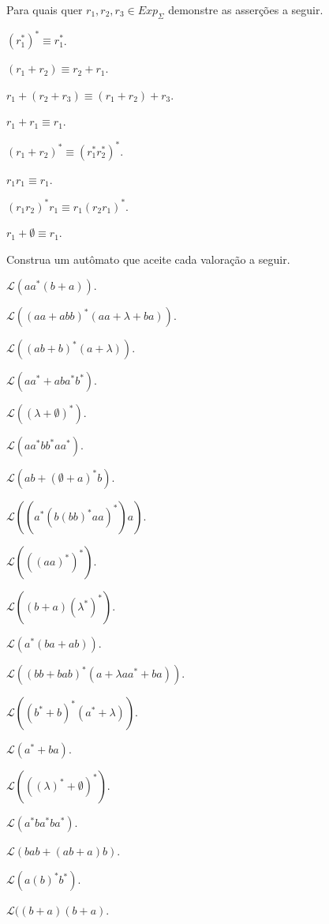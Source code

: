 \begin{problem}\label{prob:Regulares34}
	Para quais quer $r_1, r_2, r_3 \in Exp_\Sigma$ demonstre as asserções a seguir.
\end{problem}

\begin{exerList}
	\item $(r_1^*)^* \equiv r_1^*$.
	\item $(r_1 + r_2) \equiv r_2 + r_1$.
	\item $r_1 + (r_2 + r_3) \equiv (r_1 + r_2) + r_3$.
	\item $r_1 + r_1 \equiv r_1$.
	\item $(r_1 + r_2)^* \equiv (r_1^* r_2^*)^*$.
	\item $r_1r_1 \equiv r_1$.
	\item $(r_1r_2)^*r_1 \equiv r_1(r_2r_1)^*$.
	\item $r_1 + \emptyset \equiv r_1$.
\end{exerList}

\begin{problem}\label{prob:Regulares35}
	Construa um autômato que aceite cada valoração a seguir.
\end{problem}

\begin{exerList}
	\item $\mathcal{L}(aa^*(b + a))$.
	\item $\mathcal{L}((aa + abb)^*(aa + \lambda + ba))$.
	\item $\mathcal{L}((ab + b)^*(a + \lambda))$.
	\item $\mathcal{L}(aa^* + aba^*b^*)$.
	\item $\mathcal{L}((\lambda + \emptyset)^*)$.
	\item $\mathcal{L}(aa^*bb^*aa^*)$.
	\item $\mathcal{L}(ab + (\emptyset + a)^*b)$.
	\item $\mathcal{L}((a^*(b(bb)^*aa)^*)a)$.
	\item $\mathcal{L}(((aa)^*)^*)$.
	\item $\mathcal{L}((b + a)(\lambda^*)^*)$.
	\item $\mathcal{L}(a^*(ba + ab))$.
	\item $\mathcal{L}((bb + bab)^*(a + \lambda aa^* + ba))$.
	\item $\mathcal{L}((b^* + b)^*(a^* + \lambda))$.
	\item $\mathcal{L}(a^* + ba)$.
	\item $\mathcal{L}(((\lambda)^* + \emptyset)^*)$.
	\item $\mathcal{L}(a^*ba^*ba^*)$.
	\item $\mathcal{L}(bab + (ab + a)b)$.
	\item $\mathcal{L}(a(b)^*b^*)$.
	\item $\mathcal{L}((b + a)(b + a)$.
\end{exerList}

